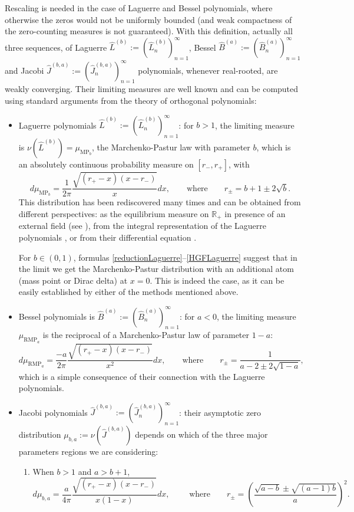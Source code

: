 \documentclass[reqno,11pt]{amsart}
\theoremstyle{remark}
\newcommand{\R}{\mathbb{R}}
\newcommand{\lag}{\widehat {L}}
\newcommand{\jac}{\widehat {J}}
\newcommand{\bes}{\widehat {B}}
\begin{document}
Rescaling is needed in the case of Laguerre and Bessel polynomials, where otherwise the zeros would not be uniformly bounded (and weak compactness of the zero-counting measures is not guaranteed). With this definition, actually all three sequences, of Laguerre $\lag^{(b)}:=\left(\lag^{(b)}_n\right)_{n=1}^{\infty}$, Bessel $\bes^{(a)}:=\left(\bes^{(a)}_n\right)_{n=1}^{\infty}$ and Jacobi $\jac^{(b,a)}:=\left(\jac^{(b,a)}_n\right)_{n=1}^{\infty}$ polynomials, whenever real-rooted, are weakly converging. Their limiting measures are well known and can be computed using standard arguments from the theory of orthogonal polynomials:
\begin{itemize}
    \item Laguerre polynomials $\lag^{(b)}:=\left(\lag^{(b)}_n\right)_{n=1}^{\infty}$: for $b >1$, the limiting measure  is $\nu(\lag^{(b)})=\mu_{\text{MP}_b}$, the Marchenko-Pastur law with parameter $b$, which is an absolutely continuous probability measure on $[r_-, r_+]$, with
$$d\mu_{\text{MP}_b}= \frac{1}{2\pi} \frac{\sqrt{(r_+-x)(x-r_-)}}{x} dx, \qquad \text{where} \qquad r_\pm= b+1 \pm 2\sqrt{b}.$$
This distribution has been rediscovered many times and can be obtained from different perspectives: as the equilibrium measure on $\R_+$ in presence of an external field (see \cite[Ch.~IV]{MR1485778}), from the integral representation of the Laguerre polynomials \cite{MR1662685, MR1342385, MR1245742}, or from their differential equation \cite{MR1317299, MR1914357}. 

For $b\in (0,1)$, formulas \eqref{reductionLaguerre}--\eqref{HGFLaguerre} suggest that in the limit we get the Marchenko-Pastur distribution with an additional atom (mass point or Dirac delta) at $x=0$. This is indeed the case, as it can be easily established by either of the methods mentioned above. 

\item Bessel polynomials is $\bes^{(a)} :=\left(\bes^{(a)}_n\right)_{n=1}^{\infty}  $: for $a <0$,  the limiting measure $\mu_{\text{RMP}_a}$ is the reciprocal of a Marchenko-Pastur law of parameter $1-a$:
$$d\mu_{\text{RMP}_a}= \frac{-a}{2\pi} \frac{\sqrt{(r_+-x)(x-r_-)}}{x^2} dx, \qquad \text{where} \qquad r_\pm= \frac{1}{a-2 \pm 2\sqrt{1-a}},$$
which is a simple consequence of their connection with the Laguerre polynomials.

\item Jacobi polynomials $\jac^{(b,a)}  := \left(\jac^{(b,a)}_{n} \right)_{n=1}^\infty$: their asymptotic zero distribution $\mu_{b,a}:=\nu(\jac^{(b,a)})$ depends on which of the three major parameters regions  we are considering:
\begin{enumerate}[(J1)]
    \item When $b >1$ and $a>b+1$,  
\begin{equation*}
    d\mu_{b,a}=\frac{a}{4\pi}\frac{\sqrt{(r_+-x)(x-r_-)}}{x(1-x)}dx, \qquad \text{ where} \qquad  r_{\pm}=\left(\frac{\sqrt{a-b}\pm \sqrt{(a-1)b}}{a} \right)^2.
\end{equation*}


\end{enumerate}
\end{itemize}
\end{document}
